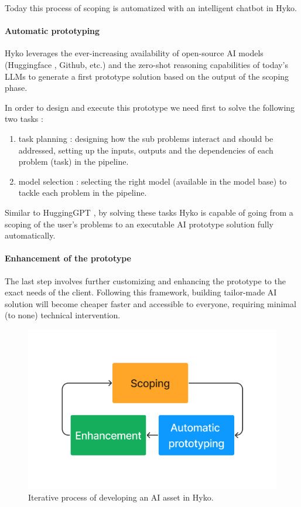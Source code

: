 \documentclass[a4paper,12pt]{article}
\begin{document}
Today this process of scoping is automatized with an intelligent chatbot in Hyko. 

\paragraph{Automatic prototyping}
Hyko leverages the ever-increasing availability of open-source AI models (Huggingface \cite{huggingface}, Github, etc.)
and the zero-shot reasoning capabilities \cite{zeroshot} of today's LLMs to generate a first prototype solution based on the output of the scoping phase.  

In order to design and execute this prototype we need first to solve the following two tasks : 

\begin{enumerate}
	\item task planning : designing how the sub problems interact and should be addressed, setting up the inputs, outputs and the dependencies of each problem (task) in the pipeline.
	\item model selection : selecting the right model (available in the model base) to tackle each problem in the pipeline.
\end{enumerate}

Similar to HuggingGPT \cite{hugginggpt}, by solving these tasks Hyko is capable of going from a scoping of the user's problems to 
an executable AI prototype solution fully automatically.


\paragraph{Enhancement of the prototype}
The last step involves further customizing and enhancing the prototype to the exact needs of the client.
Following this framework, building tailor-made AI solution will become cheaper faster and accessible to everyone, requiring minimal (to none) technical intervention.


\begin{figure}[h]
	\centering
	\includegraphics[width=.5\linewidth]{figures/3process.png}
	\caption{Iterative process of developing an AI asset in Hyko.}
	\label{fig:hykoprocess}
\end{figure}
\end{document}
